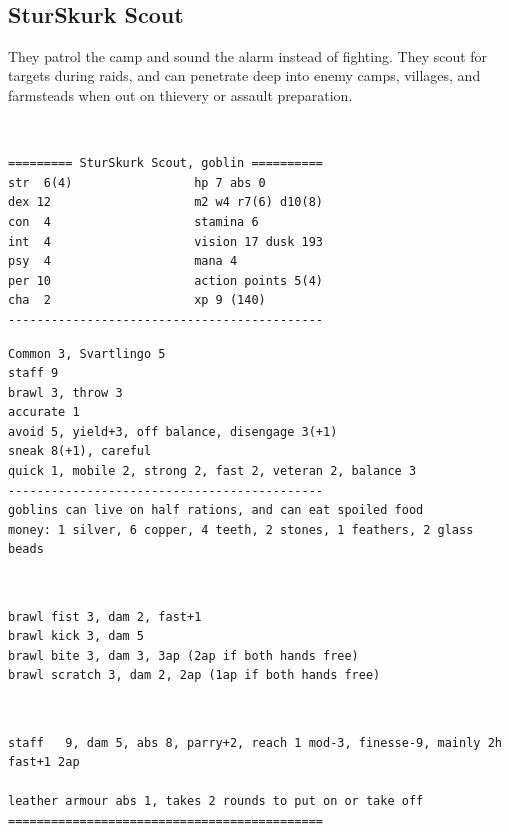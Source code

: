 \


\subsection*{SturSkurk Scout}

They patrol the camp and sound the alarm instead of fighting. They scout for targets during raids, and can penetrate deep into enemy camps, villages, and farmsteads when out on thievery or assault preparation.

\

\goodbreak \small \begin{samepage} \begin{verbatim}
========= SturSkurk Scout, goblin ==========
str  6(4)                 hp 7 abs 0
dex 12                    m2 w4 r7(6) d10(8)
con  4                    stamina 6
int  4                    vision 17 dusk 193
psy  4                    mana 4
per 10                    action points 5(4)
cha  2                    xp 9 (140)
--------------------------------------------
\end{verbatim} \goodbreak \begin{verbatim}
Common 3, Svartlingo 5
staff 9
brawl 3, throw 3
accurate 1
avoid 5, yield+3, off balance, disengage 3(+1)
sneak 8(+1), careful
quick 1, mobile 2, strong 2, fast 2, veteran 2, balance 3
--------------------------------------------
goblins can live on half rations, and can eat spoiled food
money: 1 silver, 6 copper, 4 teeth, 2 stones, 1 feathers, 2 glass beads
\end{verbatim} \begin{samepage}   \   \goodbreak \end{samepage} \begin{verbatim}
brawl fist 3, dam 2, fast+1
brawl kick 3, dam 5 
brawl bite 3, dam 3, 3ap (2ap if both hands free)
brawl scratch 3, dam 2, 2ap (1ap if both hands free)
\end{verbatim} \begin{samepage}   \   \goodbreak \end{samepage} \begin{verbatim}
staff   9, dam 5, abs 8, parry+2, reach 1 mod-3, finesse-9, mainly 2h fast+1 2ap

leather armour abs 1, takes 2 rounds to put on or take off
============================================
\end{verbatim} \end{samepage} \normalsize

\


